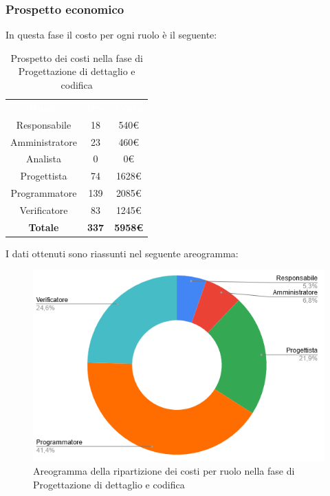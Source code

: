 \subsubsection{Prospetto economico}
In questa fase il costo per ogni ruolo è il seguente:

\begin{table}[H]
\centering\renewcommand{\arraystretch}{1.5}
\caption{Prospetto dei costi nella fase di Progettazione di dettaglio e codifica}
\vspace{0.2cm}
\begin{tabular}{ c | c | c  }
\rowcolor{redafk}
\textcolor{white}{\textbf{Ruolo}} & \textcolor{white}{\textbf{Ore}} & 
\textcolor{white}{\textbf{Costo}}  \\
Responsabile & 18 & 540€ \\
Amministratore & 23 & 460€ \\
Analista & 0 & 0€ \\
Progettista	& 74 & 1628€ \\
Programmatore & 139 & 2085€  \\
Verificatore & 83 & 1245€  \\
\rowcolor{lastrowcolor}
\textbf{Totale} & \textbf{337} & \textbf{5958€}  \\
\end{tabular}
\end{table}

I dati ottenuti sono riassunti nel seguente areogramma:
\begin{figure}[H]
\centering
\includegraphics[scale=0.60]{img/grafici/torta_fase_prog_cod.png}
\caption{Areogramma della ripartizione dei costi per ruolo nella fase di Progettazione di dettaglio e codifica}
\end{figure}

